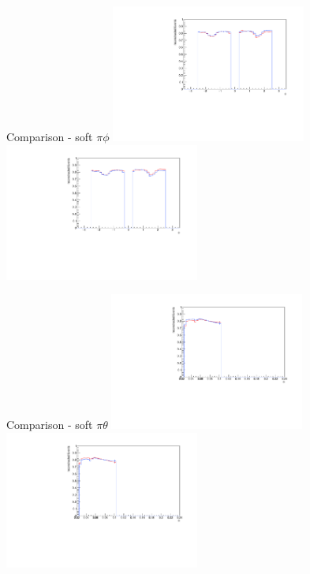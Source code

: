 \documentclass[11pt]{beamer}
\begin{document}
\begin{frame}{Comparison - soft $\pi \phi$}
\centering
\includegraphics[width=0.48\textwidth]{sec/up_pdf/combined/h_phi_reco_SPi.pdf}
\includegraphics[width=0.48\textwidth]{sec/down_pdf/combined/h_phi_reco_SPi.pdf}
\end{frame}
\begin{frame}{Comparison - soft $\pi \theta$}
\centering
\includegraphics[width=0.48\textwidth]{sec/up_pdf/combined/h_theta_reco_SPi.pdf}
\includegraphics[width=0.48\textwidth]{sec/down_pdf/combined/h_theta_reco_SPi.pdf}
\end{frame}
\end{document}

